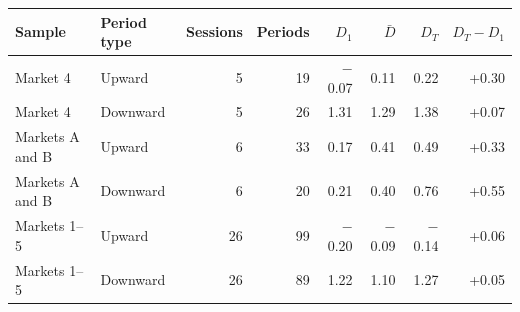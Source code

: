\begin{tabular}{llrrrrrr}
\toprule
Sample & Period type & Sessions & Periods & $D_1$ & $\bar D$ & $D_T$ & $D_T-D_1$ \\
\midrule
Market 4 & Upward & 5 & 19 & $-$0.07 & 0.11 & 0.22 & +0.30 \\
Market 4 & Downward & 5 & 26 & 1.31 & 1.29 & 1.38 & +0.07 \\
\addlinespace
Markets A and B & Upward & 6 & 33 & 0.17 & 0.41 & 0.49 & +0.33 \\
Markets A and B & Downward & 6 & 20 & 0.21 & 0.40 & 0.76 & +0.55 \\
\addlinespace
Markets 1--5 & Upward & 26 & 99 & $-$0.20 & $-$0.09 & $-$0.14 & +0.06 \\
Markets 1--5 & Downward & 26 & 89 & 1.22 & 1.10 & 1.27 & +0.05 \\
\bottomrule
\end{tabular}
